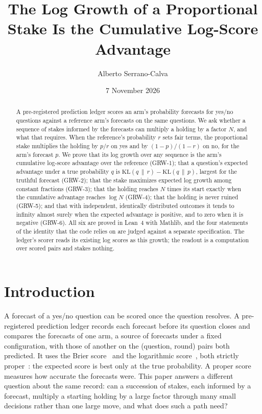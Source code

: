 \documentclass[11pt]{article}
\title{The Log Growth of a Proportional Stake Is the Cumulative Log-Score Advantage}
\author{Alberto Serrano-Calva}
\date{7 November 2026}
\theoremstyle{plain}
\theoremstyle{definition}
\theoremstyle{remark}
\newcommand{\KL}[2]{\mathrm{KL}(#1\,\|\,#2)}
\begin{document}
\maketitle

\begin{abstract}
A pre-registered prediction ledger scores an arm's probability forecasts for yes/no questions
against a reference arm's forecasts on the same questions. We ask whether a sequence of stakes
informed by the forecasts can multiply a holding by a factor $N$, and what that requires. When the
reference's probability $r$ sets fair terms, the proportional stake multiplies the holding by $p/r$
on yes and by $(1-p)/(1-r)$ on no, for the arm's forecast $p$. We prove that its log growth over any
sequence is the arm's cumulative log-score advantage over the reference (GRW-1); that a question's
expected advantage under a true probability $q$ is $\KL{q}{r}-\KL{q}{p}$, largest for the truthful
forecast (GRW-2); that the stake maximizes expected log growth among constant fractions (GRW-3);
that the holding reaches $N$ times its start exactly when the cumulative advantage reaches $\log N$
(GRW-4); that the holding is never ruined (GRW-5); and that with independent, identically
distributed outcomes it tends to infinity almost surely when the expected advantage is positive,
and to zero when it is negative (GRW-6). All six are proved in Lean~4 with Mathlib, and the four
statements of the identity that the code relies on are judged against a separate specification.
The ledger's scorer reads its existing log scores as this growth; the readout is a computation over
scored pairs and stakes nothing.
\end{abstract}

\section{Introduction}

A forecast of a yes/no question can be scored once the question resolves. A pre-registered
prediction ledger records each forecast before its question closes and compares the forecasts of
one arm, a source of forecasts under a fixed configuration, with those of another on the
(question, round) pairs both predicted. It uses the Brier score~\citep{brier1950} and the
logarithmic score~\citep{good1952}, both strictly proper~\citep{gneiting2007}: the expected score
is best only at the true probability. A proper score measures how accurate the forecasts were.
This paper answers a different question about the same record: can a succession of stakes, each
informed by a forecast, multiply a starting holding by a large factor through many small
decisions rather than one large move, and what does such a path need?
\end{document}

